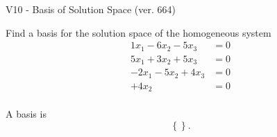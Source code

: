 \begin{exercise}
  \begin{exerciseTitle}V10 - Basis of Solution Space (ver. 664)\end{exerciseTitle}
  \begin{exerciseStatement}
    Find a basis for the solution space of the homogeneous system 
\begin{align*}
 1 x_ 1 -6 x_ 2 -5 x_ 3 &= 0  \\ 
  5 x_ 1 + 3 x_ 2 + 5 x_ 3 &= 0  \\ 
  -2 x_ 1 -5 x_ 2 + 4 x_ 3 &= 0  \\ 
  + 4 x_ 2 &= 0  \\ 
 \end{align*}


 
  \end{exerciseStatement}

  \begin{exerciseAnswer}
   A basis is   
\[\left\{\right\}.\]

  


  \end{exerciseAnswer}
\end{exercise}